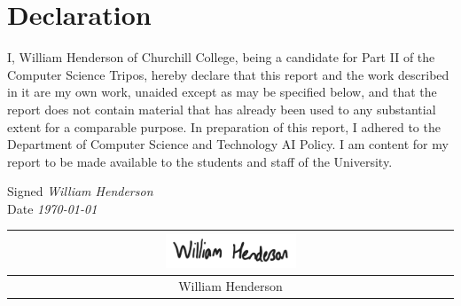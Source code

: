 \chapter*{Declaration}

I, William Henderson of Churchill College, being a candidate for Part II of the Computer Science Tripos, hereby declare that this report and the work described in it are my own work, unaided except as may be specified below, and that the report does not contain material that has already been used to any substantial extent for a comparable purpose. In preparation of this report, I adhered to the Department of Computer Science and Technology AI Policy. I am content for my report to be made available to the students and staff of the University.

Signed {\it William Henderson} \\
Date {\it \today}

\hfill {
  \begin{tabular}{c}
    \includegraphics[width=0.3\textwidth]{signature.png} \\
    \hline \rule{0pt}{1.2em} William Henderson
  \end{tabular}
}